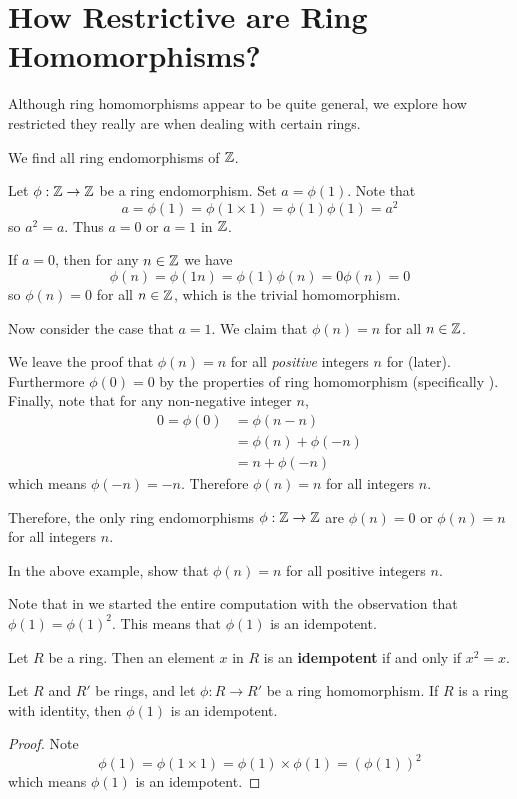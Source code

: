 \section{How Restrictive are Ring Homomorphisms?}
Although ring homomorphisms appear to be quite general, we explore how restricted they really are when dealing with certain rings.

\begin{example}\label{example-endomorphisms-of-Z}
    We find all ring endomorphisms of $\mathbb{Z}$.

    Let $\phi:\mathbb{Z}\to\mathbb{Z}$ be a ring endomorphism. Set $a = \phi(1)$. Note that
    \[
        a = \phi(1) = \phi(1\times1) = \phi(1)\phi(1) = a^2
    \]
    so $a^2 = a$. Thus $a = 0$ or $a = 1$ in $\mathbb{Z}$.

    If $a = 0$, then for any $n \in \mathbb{Z}$ we have
    \[
        \phi(n) = \phi(1n) = \phi(1)\phi(n) = 0\phi(n) = 0
    \]
    so $\phi(n) = 0$ for all $n \in \mathbb{Z}$, which is the trivial homomorphism.

    Now consider the case that $a = 1$. We claim that $\phi(n) = n$ for all $n \in \mathbb{Z}$.

    We leave the proof that $\phi(n) = n$ for all \textit{positive} integers $n$ for  (later). Furthermore $\phi(0) = 0$ by the properties of ring homomorphism (specifically ). Finally, note that for any non-negative integer $n$,
    \begin{align*}
        0 = \phi(0) &= \phi(n - n)\\
        &= \phi(n) + \phi(-n)\\
        &= n + \phi(-n)
    \end{align*}
    which means $\phi(-n) = -n$. Therefore $\phi(n) = n$ for all integers $n$.

    Therefore, the only ring endomorphisms $\phi:\mathbb{Z}\to\mathbb{Z}$ are $\phi(n) = 0$ or $\phi(n) = n$ for all integers $n$.
\end{example}
\begin{exercise}\label{exercise-homomorphism-maps-n-to-n-if-n-is-positive}
    In the above example, show that $\phi(n) = n$ for all positive integers $n$.
\end{exercise}
Note that in  we started the entire computation with the observation that $\phi(1) = \phi(1)^2$. This means that $\phi(1)$ is an idempotent.
\begin{definition}
    Let $R$ be a ring. Then an element $x$ in $R$ is an \textbf{idempotent} if and only if $x^2 = x$.
\end{definition}
\begin{proposition}\label{prop-homomorphism-on-multiplicative-identity-is-idempotent}
    Let $R$ and $R'$ be rings, and let $\phi: R \to R'$ be a ring homomorphism. If $R$ is a ring with identity, then $\phi(1)$ is an idempotent.
\end{proposition}
\begin{proof}
    Note
    \[
        \phi(1) = \phi(1 \times 1) = \phi(1) \times \phi(1) = \left(\phi(1)\right)^2
    \]
    which means $\phi(1)$ is an idempotent.
\end{proof}

